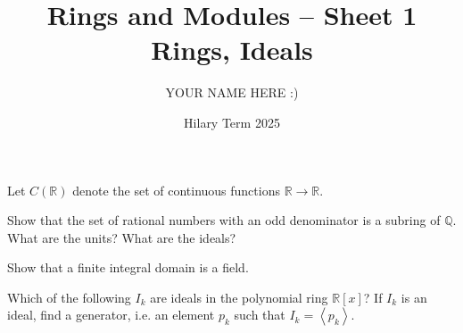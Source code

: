 \documentclass[answers]{exam}
\title{Rings and Modules -- Sheet 1\\Rings, Ideals}
\author{YOUR NAME HERE :)}
\date{Hilary Term 2025}
\begin{document}
\maketitle

\begin{questions}

\question%
Let $C(\mathbb{R})$ denote the set of continuous functions $\mathbb{R} \to \mathbb{R}$.



\question%
Show that the set of rational numbers with an odd denominator is a subring of $\mathbb{Q}$. What are the units? What are the ideals?



\question%
Show that a finite integral domain is a field.



\question%
Which of the following $I_{k}$ are ideals in the polynomial ring $\mathbb{R}[x]$? If $I_{k}$ is an ideal, find a generator, i.e. an element $p_{k}$ such that $I_{k}=\left\langle p_{k}\right\rangle$.
\end{questions}
\end{document}
